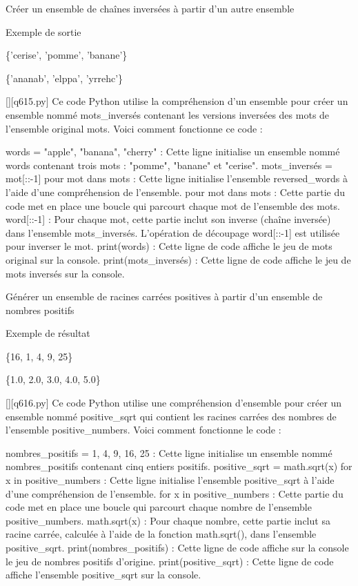         \question
        Créer un ensemble de chaînes inversées à partir d'un autre ensemble

Exemple de sortie

\{'cerise', 'pomme', 'banane'\}

\{'ananab', 'elppa', 'yrrehc'\}
        \par
        \begin{solution}
            \renewcommand{\nomfichier}{q615.py}
            \pythonfile{\chemincode \nomfichier}[][\nomfichier]
            Ce code Python utilise la compréhension d'un ensemble pour créer un ensemble nommé mots_inversés contenant les versions inversées des mots de l'ensemble original mots. Voici comment fonctionne ce code :

    words = {"apple", "banana", "cherry"} : Cette ligne initialise un ensemble nommé words contenant trois mots : "pomme", "banane" et "cerise".
    mots_inversés = {mot[::-1] pour mot dans mots} : Cette ligne initialise l'ensemble reversed_words à l'aide d'une compréhension de l'ensemble.
        pour mot dans mots : Cette partie du code met en place une boucle qui parcourt chaque mot de l'ensemble des mots.
        {word[::-1]} : Pour chaque mot, cette partie inclut son inverse (chaîne inversée) dans l'ensemble mots_inversés. L'opération de découpage word[::-1] est utilisée pour inverser le mot.
    print(words) : Cette ligne de code affiche le jeu de mots original sur la console.
    print(mots_inversés) : Cette ligne de code affiche le jeu de mots inversés sur la console.
        \end{solution}
        

        \question
        Générer un ensemble de racines carrées positives à partir d'un ensemble de nombres positifs

Exemple de résultat

\{16, 1, 4, 9, 25\}

\{1.0, 2.0, 3.0, 4.0, 5.0\}
        \par
        \begin{solution}
            \renewcommand{\nomfichier}{q616.py}
            \pythonfile{\chemincode \nomfichier}[][\nomfichier]
            Ce code Python utilise une compréhension d'ensemble pour créer un ensemble nommé positive_sqrt qui contient les racines carrées des nombres de l'ensemble positive_numbers. Voici comment fonctionne le code :

    nombres_positifs = {1, 4, 9, 16, 25} : Cette ligne initialise un ensemble nommé nombres_positifs contenant cinq entiers positifs.
    positive_sqrt = {math.sqrt(x) for x in positive_numbers} : Cette ligne initialise l'ensemble positive_sqrt à l'aide d'une compréhension de l'ensemble.
        for x in positive_numbers : Cette partie du code met en place une boucle qui parcourt chaque nombre de l'ensemble positive_numbers.
        {math.sqrt(x)} : Pour chaque nombre, cette partie inclut sa racine carrée, calculée à l'aide de la fonction math.sqrt(), dans l'ensemble positive_sqrt.
    print(nombres_positifs) : Cette ligne de code affiche sur la console le jeu de nombres positifs d'origine.
    print(positive_sqrt) : Cette ligne de code affiche l'ensemble positive_sqrt sur la console.
        \end{solution}
        

